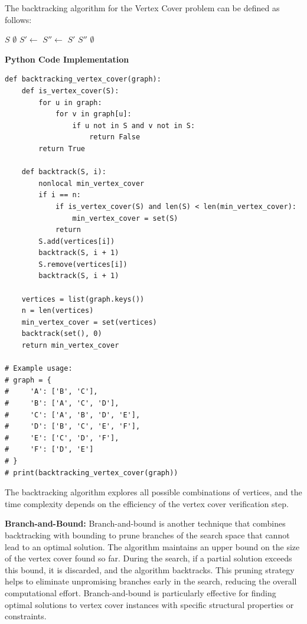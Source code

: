 \documentclass[12pt]{book} %
\begin{document}
The backtracking algorithm for the Vertex Cover problem can be defined as follows:
\FloatBarrier
\begin{algorithm}
\caption{Backtracking Vertex Cover}
\begin{algorithmic}[1]
        \State \Return $S$
    \Else
        \State \Return $\emptyset$
    \EndIf
\EndIf
\State $S' \gets$ 
\State $S'' \gets$ 
    \State \Return $S'$
    \State \Return $S''$
\Else
    \State \Return $\emptyset$
\EndIf
\EndFunction
\end{algorithmic}
\end{algorithm}
\FloatBarrier

\textbf{Python Code Implementation}
\FloatBarrier
\begin{lstlisting}
def backtracking_vertex_cover(graph):
    def is_vertex_cover(S):
        for u in graph:
            for v in graph[u]:
                if u not in S and v not in S:
                    return False
        return True
    
    def backtrack(S, i):
        nonlocal min_vertex_cover
        if i == n:
            if is_vertex_cover(S) and len(S) < len(min_vertex_cover):
                min_vertex_cover = set(S)
            return
        S.add(vertices[i])
        backtrack(S, i + 1)
        S.remove(vertices[i])
        backtrack(S, i + 1)
    
    vertices = list(graph.keys())
    n = len(vertices)
    min_vertex_cover = set(vertices)
    backtrack(set(), 0)
    return min_vertex_cover

# Example usage:
# graph = {
#     'A': ['B', 'C'],
#     'B': ['A', 'C', 'D'],
#     'C': ['A', 'B', 'D', 'E'],
#     'D': ['B', 'C', 'E', 'F'],
#     'E': ['C', 'D', 'F'],
#     'F': ['D', 'E']
# }
# print(backtracking_vertex_cover(graph))
\end{lstlisting}
\FloatBarrier
The backtracking algorithm explores all possible combinations of vertices, and the time complexity depends on the efficiency of the vertex cover verification step.

\textbf{Branch-and-Bound:} Branch-and-bound is another technique that combines backtracking with bounding to prune branches of the search space that cannot lead to an optimal solution. The algorithm maintains an upper bound on the size of the vertex cover found so far. During the search, if a partial solution exceeds this bound, it is discarded, and the algorithm backtracks. This pruning strategy helps to eliminate unpromising branches early in the search, reducing the overall computational effort. Branch-and-bound is particularly effective for finding optimal solutions to vertex cover instances with specific structural properties or constraints.
\end{document}
